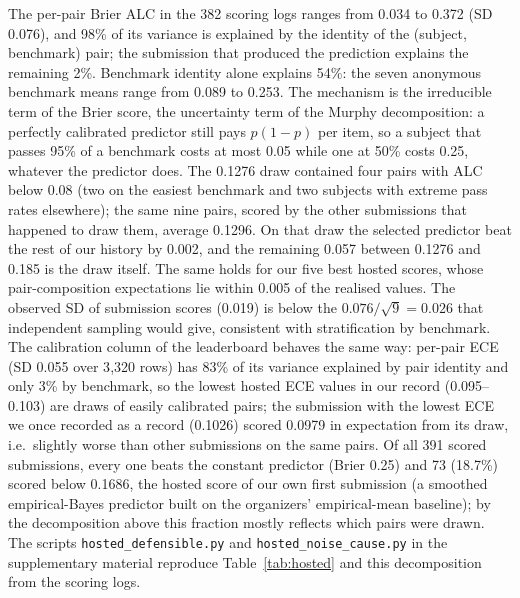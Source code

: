 \documentclass{article}
\begin{document}
The per-pair Brier ALC in the 382 scoring logs ranges from 0.034 to 0.372 (SD 0.076), and 98\% of its variance is explained by the identity of the (subject, benchmark) pair; the submission that produced the prediction explains the remaining 2\%. Benchmark identity alone explains 54\%: the seven anonymous benchmark means range from 0.089 to 0.253. The mechanism is the irreducible term of the Brier score, the uncertainty term of the Murphy decomposition: a perfectly calibrated predictor still pays $p(1-p)$ per item, so a subject that passes 95\% of a benchmark costs at most 0.05 while one at 50\% costs 0.25, whatever the predictor does. The 0.1276 draw contained four pairs with ALC below 0.08 (two on the easiest benchmark and two subjects with extreme pass rates elsewhere); the same nine pairs, scored by the other submissions that happened to draw them, average 0.1296. On that draw the selected predictor beat the rest of our history by 0.002, and the remaining 0.057 between 0.1276 and 0.185 is the draw itself. The same holds for our five best hosted scores, whose pair-composition expectations lie within 0.005 of the realised values. The observed SD of submission scores (0.019) is below the $0.076/\sqrt{9}=0.026$ that independent sampling would give, consistent with stratification by benchmark. The calibration column of the leaderboard behaves the same way: per-pair ECE (SD 0.055 over 3{,}320 rows) has 83\% of its variance explained by pair identity and only 3\% by benchmark, so the lowest hosted ECE values in our record (0.095--0.103) are draws of easily calibrated pairs; the submission with the lowest ECE we once recorded as a record (0.1026) scored 0.0979 in expectation from its draw, i.e.\ slightly worse than other submissions on the same pairs. Of all 391 scored submissions, every one beats the constant predictor (Brier 0.25) and 73 (18.7\%) scored below 0.1686, the hosted score of our own first submission (a smoothed empirical-Bayes predictor built on the organizers' empirical-mean baseline); by the decomposition above this fraction mostly reflects which pairs were drawn. The scripts \texttt{hosted\_defensible.py} and \texttt{hosted\_noise\_cause.py} in the supplementary material reproduce Table~\ref{tab:hosted} and this decomposition from the scoring logs.
\end{document}
